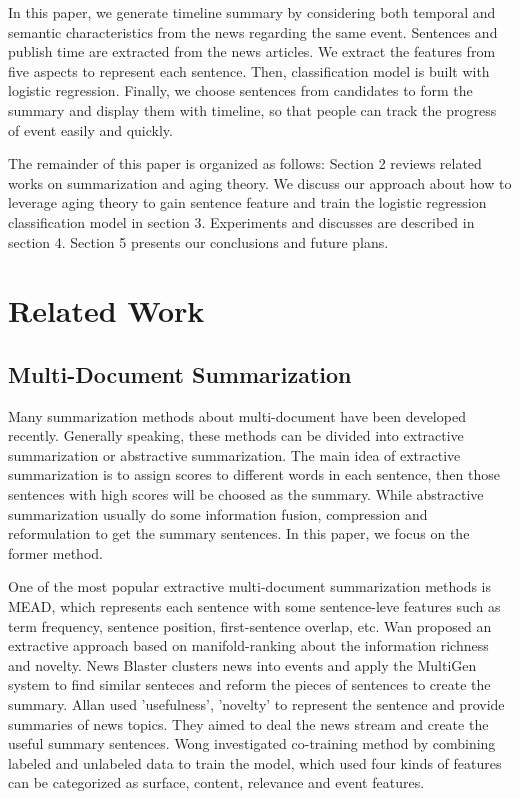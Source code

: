 \documentclass[print]{jicspack}
\begin{document}
In this paper, we generate timeline summary by considering both temporal and semantic characteristics from the news regarding the same event.
Sentences and publish time are extracted from the news articles. 
We extract the features from five aspects to represent each sentence. 
Then, classification model is built with logistic regression. 
Finally, we choose sentences from candidates to form the summary and display them with timeline, so that people can track the progress of event easily and quickly.

The remainder of this paper is organized as follows: Section 2 reviews related works on summarization and aging theory. 
We discuss our approach about how to leverage aging theory to gain sentence feature and train the logistic regression classification model in section 3. 
Experiments and discusses are described in section 4. 
Section 5 presents our conclusions and future plans.


\section{Related Work}

\subsection{Multi-Document Summarization}

Many summarization methods about multi-document have been developed recently. 
Generally speaking, these methods can be divided into extractive summarization or abstractive summarization.
The main idea of extractive summarization is to assign scores to different words in each sentence, then those sentences with high scores will be choosed as the summary.
While abstractive summarization usually do some information fusion\cite{barzilay1999information}, compression\cite{2002-Knight-p91-107} and reformulation\cite{mckeown1999towards} to get the summary sentences.
In this paper, we focus on the former method.

One of the most popular extractive multi-document summarization methods is MEAD\cite{2004-Radev-p919-938}, which represents each sentence with some sentence-leve features such as term frequency, sentence position, first-sentence overlap, etc. 
Wan\cite{wan2007manifold} proposed an extractive approach based on manifold-ranking about the information richness and novelty.
News Blaster\cite{McKeown2003} clusters news into events and apply the MultiGen system to find similar senteces and reform the pieces of sentences to create the summary.
Allan\cite{2001-Allan-p10-18} used 'usefulness', 'novelty' to represent the sentence and provide summaries of news topics. 
They aimed to deal the news stream and create the useful summary sentences.
Wong\cite{2008-Wong-p985-992} investigated co-training method by combining labeled and unlabeled data to train the model, which used four kinds of features can be categorized as surface, content, relevance and event features.
\end{document}

